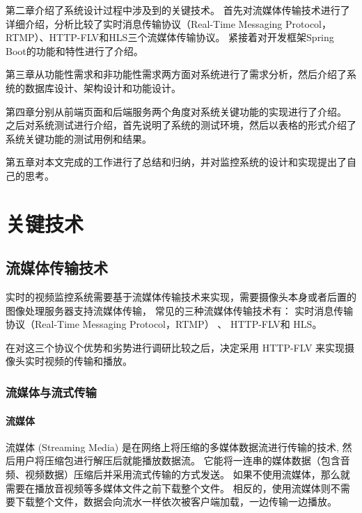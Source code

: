 第二章介绍了系统设计过程中涉及到的关键技术。
首先对流媒体传输技术进行了详细介绍，分析比较了实时消息传输协议（Real-Time Messaging Protocol，RTMP）、HTTP-FLV和HLS三个流媒体传输协议。
紧接着对开发框架Spring Boot的功能和特性进行了介绍。


第三章从功能性需求和非功能性需求两方面对系统进行了需求分析，然后介绍了系统的数据库设计、架构设计和功能设计。

第四章分别从前端页面和后端服务两个角度对系统关键功能的实现进行了介绍。
之后对系统测试进行介绍，首先说明了系统的测试环境，然后以表格的形式介绍了
系统关键功能的测试用例和结果。


第五章对本文完成的工作进行了总结和归纳，并对监控系统的设计和实现提出了自己的思考。

\chapter{关键技术}
\section{流媒体传输技术}
实时的视频监控系统需要基于流媒体传输技术来实现，需要摄像头本身或者后置的图像处理服务器支持流媒体传输，
常见的三种流媒体传输技术有：
实时消息传输协议（Real-Time Messaging Protocol，RTMP） 、
HTTP-FLV和
HLS。

在对这三个协议个优势和劣势进行调研比较之后，决定采用
HTTP-FLV 来实现摄像头实时视频的传输和播放。

\subsection{流媒体与流式传输}
\subsubsection{流媒体}
流媒体 (Streaming Media) 是在网络上将压缩的多媒体数据流进行传输的技术, 然后用户将压缩包进行解压后就能播放数据流\cite{万梅芬2018基于流媒体技术的数字化校园文化设计与实现}。
它能将一连串的媒体数据（包含音频、视频数据）压缩后并采用流式传输的方式发送。
如果不使用流媒体，那么就需要在播放音视频等多媒体文件之前下载整个文件。
相反的，使用流媒体则不需要下载整个文件，数据会向流水一样依次被客户端加载，一边传输一边播放。

